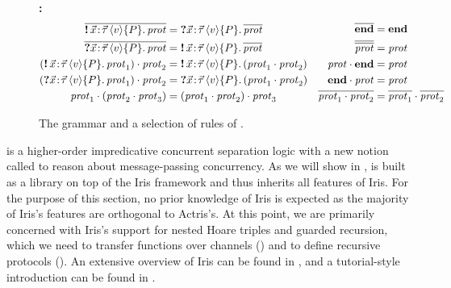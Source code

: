 {\begin{figure}
\smallskip
\textbf{\Pname:}
\[\begin{aligned}
  \dual{\sendprot{\xdots}{\val}{\iprop}{\prot}} ={}& \recvprot{\xdots}{\val}{\iprop}{\dual{\prot}} \\
  \dual{\recvprot{\xdots}{\val}{\iprop}{\prot}} ={}& \sendprot{\xdots}{\val}{\iprop}{\dual{\prot}} \\
  \protapp{(\sendprot{\xdots}{\val}{\iprop}{\prot_1})}{\prot_2} ={}&
  \sendprot{\xdots}{\val}{\iprop}{(\protapp{\prot_1}{\prot_2})} \\
  \protapp{(\recvprot{\xdots}{\val}{\iprop}{\prot_1})}{\prot_2} ={}&
  \recvprot{\xdots}{\val}{\iprop}{(\protapp{\prot_1}{\prot_2})} \\
  \protapp{\prot_1}{(\protapp{\prot_2}{\prot_3})} ={}& \protapp{(\protapp{\prot_1}{\prot_2})}{\prot_3}\\
\end{aligned}
\quad
\begin{aligned}
  \dual{\protend} ={}& \protend \\
  \dual{\dual{\prot}} ={}& \prot \\
  \protapp\prot\protend ={}& \prot \\
  \protapp\protend\prot ={}& \prot \\
  \dual{\protapp{\prot_1}{\prot_2}} ={}& \protapp{\dual{\prot_1}}{\dual{\prot_2}}
\end{aligned}\]
\caption{The grammar and a selection of rules of \lname.}
\label{fig:logic}
\end{figure}
}

\logicfig

\lname is a higher-order impredicative concurrent separation logic with a
new notion called \emph{\pname} to reason about message-passing concurrency.
As we will show in , \lname is built as a library on top of the Iris
framework \cite{jung-POPL2015,krebbers-ESOP2017,jung-ICFP06,jung-JFP2018} and
thus inherits all features of Iris.
For the purpose of this section, no prior knowledge of Iris is expected
as the majority of Iris's features are orthogonal to Actris's.
At this point, we are primarily concerned with Iris's support for nested Hoare
triples and guarded recursion, which we need to transfer functions over channels
() and to define recursive protocols
().
An extensive overview of Iris can be found in \cite{jung-JFP2018}, and a
tutorial-style introduction can be found in \cite{lecturenotes}.

